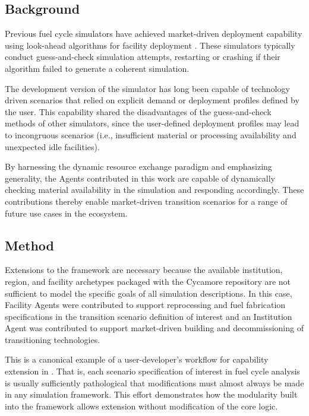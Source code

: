 
\subsection{Background}

Previous fuel cycle simulators have achieved market-driven deployment 
capability using look-ahead algorithms for facility deployment 
\cite{schneider_nfcsim:_2005,jacobson_user_2011}.  These simulators typically 
conduct guess-and-check simulation attempts, restarting or crashing if their 
algorithm failed to generate a coherent simulation.


The development version of the \Cyclus simulator has long been capable of 
technology driven scenarios \cite{gidden_once-through_2012} that relied 
on explicit demand or deployment profiles defined by the user. This capability 
shared the disadvantages of the guess-and-check methods of other simulators, 
since the user-defined deployment profiles may lead to incongruous scenarios 
(i.e., insufficient material or processing availability and unexpected idle 
facilities).  

By harnessing the \Cyclus dynamic resource exchange paradigm and emphasizing 
generality, the Agents contributed in this work are capable of dynamically 
checking material availability in the simulation and responding accordingly. 
These contributions thereby enable market-driven transition scenarios for a 
range of future use cases in the \Cyclus ecosystem.  


\subsection{Method}

Extensions to the \Cyclus framework are necessary because the available
institution, region, and facility archetypes packaged with the Cycamore
repository are not sufficient to model the specific goals of all simulation 
descriptions.  In this case, Facility Agents were contributed to support 
reprocessing and fuel fabrication specifications in the transition scenario
definition of interest and an Institution Agent was contributed to support 
market-driven building and decommissioning of transitioning technologies.  

This is a canonical example of a user-developer's workflow for capability 
extension in \Cyclus. That is, each scenario specification of interest in fuel
cycle analysis is usually sufficiently pathological that modifications must
almost always be made in any simulation framework. This effort demonstrates how 
the modularity built into
the \Cyclus framework allows extension without modification of the core logic.  

